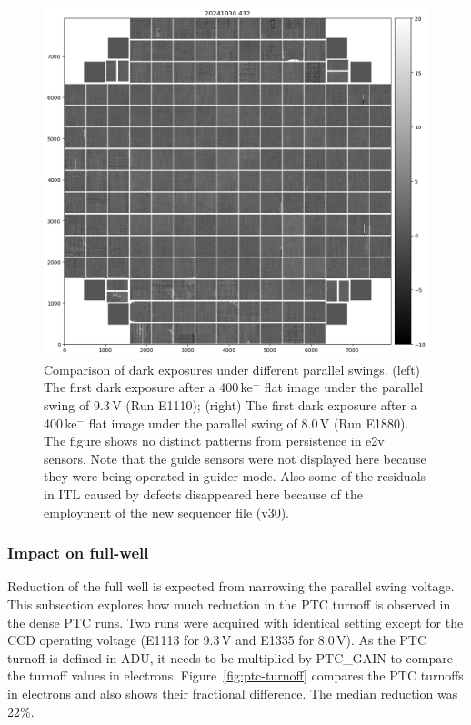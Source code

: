 \begin{figure}
\begin{minipage}[b]{0.45\textwidth}
\includegraphics[width=\textwidth]{sections/figures/E1880dp80.png}
\end{minipage}
\caption{Comparison of dark exposures under different parallel swings. (left) The first dark exposure after a 400\,ke$^-$ flat image under the parallel swing of 9.3\,V (Run E1110); (right) The first dark exposure after a 400\,ke$^-$ flat image under the parallel swing of 8.0\,V (Run E1880). The figure shows no distinct patterns from persistence in e2v sensors. Note that the guide sensors were not displayed here because they were being operated in guider mode. Also some of the residuals in ITL caused by defects disappeared here because of the employment of the new sequencer file (v30).}
\label{fig:persistence-reduction}
\end{figure}



\subsubsection{Impact on full-well}\label{impact-on-full-well}

Reduction of the full well is expected from narrowing the parallel swing
voltage. This subsection explores how much reduction in the PTC turnoff
is observed in the dense PTC runs. Two runs were acquired with identical
setting except for the CCD operating voltage (E1113 for 9.3\,V and E1335
for 8.0\,V). As the PTC turnoff is defined in ADU, it needs to be
multiplied by PTC\_GAIN to compare the turnoff values in electrons.
Figure~\ref{fig:ptc-turnoff} compares the PTC turnoffs in electrons and also shows their
fractional difference. The median reduction was 22\%.

